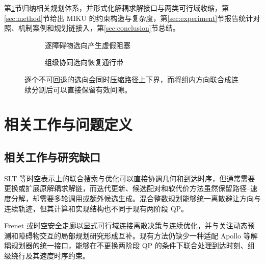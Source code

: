 \documentclass[a4paper,zihao=5]{ctexart}
\theoremstyle{definition}
\begin{document}
第\ref{sec:related}节归纳相关规划体系，并形式化解耦求解接口与两类可行域收缩，第\ref{sec:method}节给出 MIKU 的约束构造与复杂度，第\ref{sec:experiment}节报告统计对照、机制案例和规划链接入，第\ref{sec:conclusion}节总结。

\begin{figure}[htbp]
\centering
\begin{subfigure}[b]{0.48\textwidth}
  \centering
  \caption{逐障碍物选向产生虚假阻塞}
\end{subfigure}\hfill
\begin{subfigure}[b]{0.48\textwidth}
  \centering
  \caption{组级协同选向恢复通行带}
\end{subfigure}
\caption{本文处理的多障碍物空间选向冲突}
\caption*{逐个不可回退的选向会同时压缩路径上下界，而将组内方向联合成连续分割后可以直接保留有效间隙。}
\label{fig:q34_teaser}
\end{figure}

\section{相关工作与问题定义}
\label{sec:related}
\label{sec:problem}

\subsection{相关工作与研究缺口}

SLT 等时空表示上的联合搜索与优化可以直接协调几何和到达时序，但通常需要更换或扩展原解耦求解链\citep{mcnaughton2011lattice,yang2021_ia_planner,hu2023_hybrid_astar_slt,hu2025_dp_nmpc,qiao2025stjoint}，而迭代更新、候选配对和软代价方法虽然保留路径--速度分解，却需要多轮调用或额外候选生成\citep{liu2017speed,chen2019em,zhang2023_dp_rcg,han2026_contingency,pathspeedstructured2024}。混合整数规划能够统一离散避让方向与连续轨迹，但其计算和实现结构也不同于现有两阶段 QP\citep{kessler2023}。

Frenet 或时空安全走廊以显式可行域连接离散决策与连续优化\citep{liu2017sfc,yoon2024stcorridor,frenetcorridor2025}，并与关注动态预测和障碍物交互的局部规划研究形成互补\citep{schwarting2018planning,yangbo2023ped,jeong2021ml}。现有方法仍缺少一种适配 Apollo 等解耦规划器\citep{fan2018baidu,apollo2024}的统一接口，能够在不更换两阶段 QP 的条件下联合处理到达时刻、组级绕行及其速度时序约束。

\end{document}
